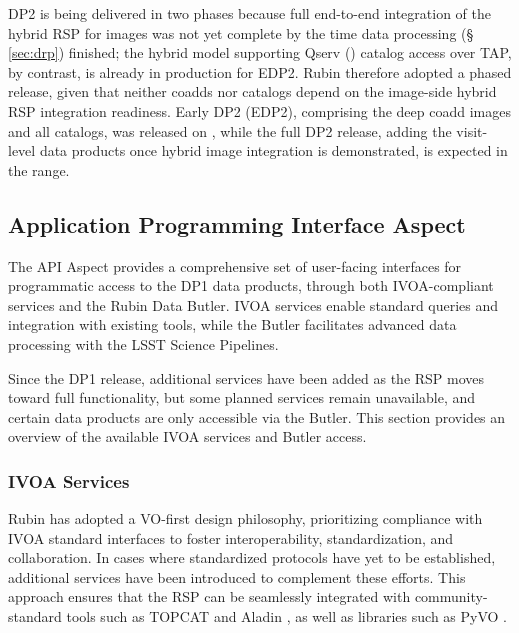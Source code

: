 \gls{DP2} is being delivered in two phases because full end-to-end integration of the hybrid RSP for images was not yet complete by the time data processing (\S\,\ref{sec:drp}) finished; the hybrid model supporting Qserv () catalog access over TAP, by contrast, is already in production for  \gls{EDP2}.
Rubin therefore adopted a phased release, given that neither coadds nor catalogs depend on the image-side hybrid \gls{RSP} integration readiness.
Early DP2 (\gls{EDP2}), comprising the deep coadd images and all catalogs, was released on \edptworeleasedate, while the full \gls{DP2} release, adding the visit-level data products once hybrid image integration is demonstrated, is expected in the \dptworeleasedate range.

\subsection{Application Programming Interface Aspect}
\label{ssec:rsp_api}
%
The \gls{API} Aspect provides a comprehensive set of user-facing interfaces for programmatic access to the \gls{DP1} data products, through both \gls{IVOA}-compliant services and the Rubin Data \gls{Butler}.
IVOA services enable standard queries and integration with existing tools, while the Butler facilitates advanced data processing with the \gls{LSST} Science Pipelines.

Since the \gls{DP1} release, additional services have been added as the RSP moves toward full functionality, but some planned services remain unavailable, and certain data products are only accessible via the \gls{Butler}.
This section provides an overview of the available \gls{IVOA} services and Butler access.


\subsubsection{IVOA Services}
\label{sssec:ivoa_services}
%
Rubin has adopted a \gls{VO}-first design philosophy, prioritizing compliance with \gls{IVOA} standard interfaces to foster \gls{interoperability}, standardization, and collaboration.
In cases where standardized protocols have yet to be established, additional services have been introduced to complement these efforts.
This approach ensures that the \gls{RSP} can be seamlessly integrated with community-standard tools such as \gls{TOPCAT} \citep[][]{2011ascl.soft01010T} and Aladin \citep[][]{2000A&AS..143...33B, 2014ASPC..485..277B, 2022ASPC..532....7B}, as well as libraries such as PyVO \citep[][]{2014ascl.soft02004G}.

